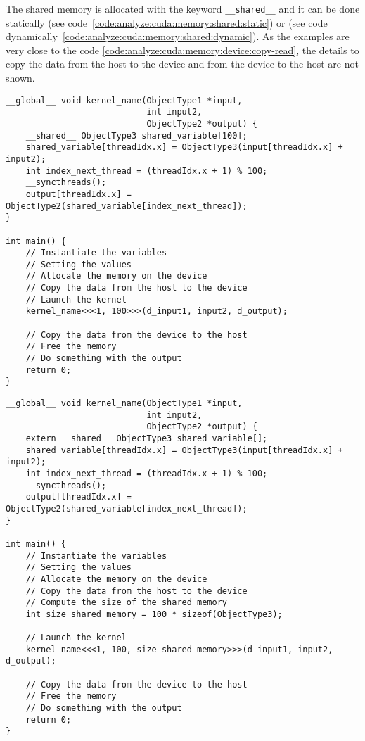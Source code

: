 The shared memory is allocated with the keyword \texttt{\_\_shared\_\_} and it
can be done statically (see code~\ref{code:analyze:cuda:memory:shared:static}) or
(see code dynamically~\ref{code:analyze:cuda:memory:shared:dynamic}).
As the examples are very close to the code \ref{code:analyze:cuda:memory:device:copy-read},
the details to copy the data from the host to the device and from the device to
the host are not shown.

\begin{code}
    \label{code:analyze:cuda:memory:shared:static}
    \begin{verbatim}
__global__ void kernel_name(ObjectType1 *input,
                            int input2,
                            ObjectType2 *output) {
    __shared__ ObjectType3 shared_variable[100];
    shared_variable[threadIdx.x] = ObjectType3(input[threadIdx.x] + input2);
    int index_next_thread = (threadIdx.x + 1) % 100;
    __syncthreads();
    output[threadIdx.x] = ObjectType2(shared_variable[index_next_thread]);
}

int main() {
    // Instantiate the variables
    // Setting the values
    // Allocate the memory on the device
    // Copy the data from the host to the device
    // Launch the kernel
    kernel_name<<<1, 100>>>(d_input1, input2, d_output);

    // Copy the data from the device to the host
    // Free the memory
    // Do something with the output
    return 0;
}
    \end{verbatim}
\end{code}

\begin{code}
    \label{code:analyze:cuda:memory:shared:dynamic}
    \begin{verbatim}
__global__ void kernel_name(ObjectType1 *input,
                            int input2,
                            ObjectType2 *output) {
    extern __shared__ ObjectType3 shared_variable[];
    shared_variable[threadIdx.x] = ObjectType3(input[threadIdx.x] + input2);
    int index_next_thread = (threadIdx.x + 1) % 100;
    __syncthreads();
    output[threadIdx.x] = ObjectType2(shared_variable[index_next_thread]);
}

int main() {
    // Instantiate the variables
    // Setting the values
    // Allocate the memory on the device
    // Copy the data from the host to the device
    // Compute the size of the shared memory
    int size_shared_memory = 100 * sizeof(ObjectType3);

    // Launch the kernel
    kernel_name<<<1, 100, size_shared_memory>>>(d_input1, input2, d_output);

    // Copy the data from the device to the host
    // Free the memory
    // Do something with the output
    return 0;
}
    \end{verbatim}
\end{code}


